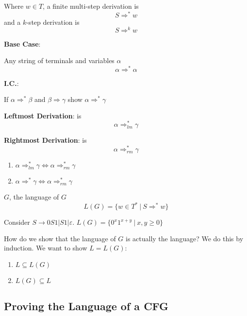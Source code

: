 \documentclass[12pt]{article}
\begin{document}
Where $w \in T$, a finite multi-step derivation is
\begin{equation}
	S \Rightarrow^* w
\end{equation}
and a $k$-step derivation is
\begin{equation}
	S \Rightarrow^kw
\end{equation}

\textbf{Base Case}:

Any string of terminals and variables $\alpha$
\begin{equation}
	\alpha \Rightarrow^*\alpha
\end{equation}

\textbf{I.C.}:

If $\alpha \Rightarrow^* \beta$ and $\beta \Rightarrow \gamma$ show $\alpha
\Rightarrow^* \gamma$

\textbf{Leftmost Derivation}: is 
\begin{equation}
	\alpha \Rightarrow^*_{lm} \gamma
\end{equation}

\textbf{Rightmost Derivation}: is 
\begin{equation}
	\alpha \Rightarrow^*_{rm} \gamma
\end{equation}

\begin{enumerate}
	\item $\alpha \Rightarrow^*_{lm} \gamma \iff \alpha \Rightarrow^*_{rm} \gamma $
	\item $\alpha \Rightarrow^* \gamma \iff \alpha \Rightarrow^*_{rm} \gamma $
\end{enumerate}

$G$, the language of $G$
\begin{equation}
	L(G) = \{w \in T^*\ |\ S \Rightarrow^*w \}
\end{equation}

Consider
$S \to 0S1 | S1 | \varepsilon$. $L(G) = \{0^x1^{x+y}\ |\ x,y\ge0\}$

How do we show that the language of $G$ is actually the language?  We do this by
induction. We want to show $L = L(G)$:
\begin{enumerate}
	\item $L \subseteq L(G)$
	\item $L(G) \subseteq L$
\end{enumerate}

\subsection{Proving the Language of a CFG}
\end{document}
